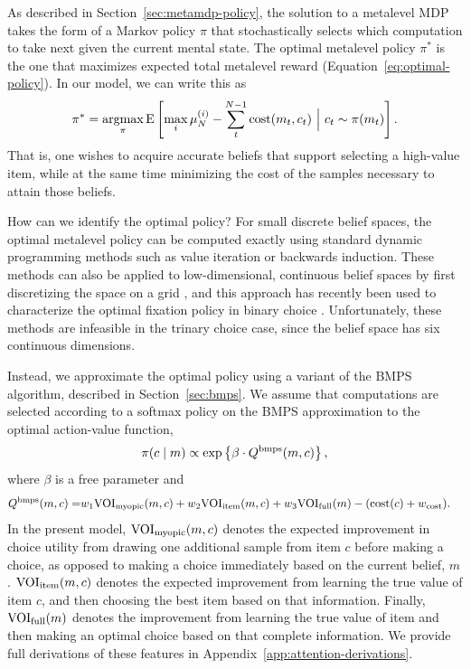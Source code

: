 As described in Section~\ref{sec:metamdp-policy}, the solution to a metalevel MDP takes the form of a Markov policy $\pi$ that stochastically selects which computation to take next given the current mental state. The optimal metalevel policy $\pi^*$ is the one that maximizes expected total metalevel reward (Equation~\ref{eq:optimal-policy}). In our model, we can write this as
\begin{equation*}
  \pi^* = \operatorname*{argmax}_{\pi} \operatorname*{E} \left[
     \max_i \mu_N^{(i)} - \sum_t^{N-1} \text{cost}(m_t, c_t)
   \ \Big\vert\ c_t \sim \pi(m_t) \right].
\end{equation*}
That is, one wishes to acquire accurate beliefs that support selecting a high-value item, while at the same time minimizing the cost of the samples necessary to attain those beliefs.

How can we identify the optimal policy? For small discrete belief spaces, the optimal metalevel policy can be computed exactly using standard dynamic programming methods such as value iteration or backwards induction. These methods can also be applied to low-dimensional, continuous belief spaces by first discretizing the space on a grid \citep{tajima2019optimal}, and this approach has recently been used to characterize the optimal fixation policy in binary choice \citep{jang2021optimal}. Unfortunately, these methods are infeasible in the trinary choice case, since the belief space has six continuous dimensions. 

Instead, we approximate the optimal policy using a variant of the BMPS algorithm, described in Section~\ref{sec:bmps}. We assume that computations are selected according to a softmax policy on the BMPS approximation to the optimal action-value function,
\begin{equation}
  \pi(c \mid m) \propto \exp\left\{\beta \cdot Q^{\mathrm{bmps}}(m, c)\right\},
\end{equation}
where $\beta$ is a free parameter and
\begin{equation}\label{eq:attention-bmps}
  \begin{aligned}
    Q^{\mathrm{bmps}}(m, c) = & w_{1}\text{VOI}_\text{myopic}(m,c)+w_{2}\text{VOI}_\text{item}(m,c) +
     w_{3}\text{VOI}_\text{full}(m) -(\text{cost}(c)+w_{\text{cost}}).
  \end{aligned}
\end{equation}
In the present model, $\text{VOI}_\text{myopic}(m,c)$ denotes the expected improvement in choice utility from drawing one additional sample from item $c$ before making a choice, as opposed to making a choice immediately based on the current belief, $m$. $\text{VOI}_\text{item}(m,c)$ denotes the expected improvement from learning the true value of item $c$, and then choosing the best item based on that information. Finally, $\text{VOI}_\text{full}(m)$ denotes the improvement from learning the true value of  item and then making an optimal choice based on that complete information. We provide full derivations of these features in Appendix~\ref{app:attention-derivations}.

